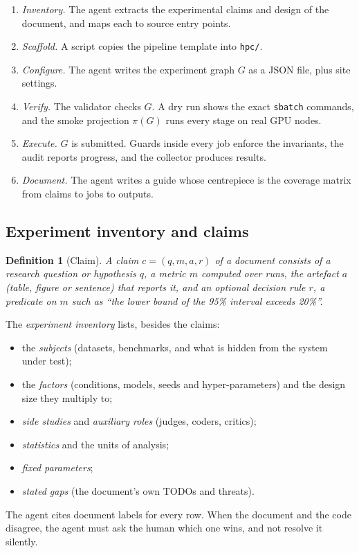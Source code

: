 \documentclass[pdflatex,sn-mathphys-num]{sn-jnl}
\theoremstyle{thmstyleone}%
\theoremstyle{thmstyletwo}%
\theoremstyle{thmstylethree}%
\newtheorem{definition}{Definition}%
\newcommand{\code}[1]{\texttt{#1}}
\begin{document}
\begin{enumerate}[leftmargin=1.4em, itemsep=1pt]
\item \emph{Inventory.} The agent extracts the experimental claims and design
of the document, and maps each to source entry points.
\item \emph{Scaffold.} A script copies the pipeline template into
\code{hpc/}.
\item \emph{Configure.} The agent writes the experiment graph $G$ as a JSON
file, plus site settings.
\item \emph{Verify.} The validator checks $G$. A dry run shows the exact
\code{sbatch} commands, and the smoke projection $\pi(G)$ runs every stage on
real GPU nodes.
\item \emph{Execute.} $G$ is submitted. Guards inside every job enforce the
invariants, the audit reports progress, and the collector produces results.
\item \emph{Document.} The agent writes a guide whose centrepiece is the
coverage matrix from claims to jobs to outputs.
\end{enumerate}

\subsection{Experiment inventory and claims}\label{sec:inventory}

\begin{definition}[Claim]\label{def:claim}
A \emph{claim} $c=(q,m,a,r)$ of a document consists of a research question or
hypothesis $q$, a metric $m$ computed over runs, the artefact $a$ (table,
figure or sentence) that reports it, and an optional decision rule $r$, a
predicate on $m$ such as ``the lower bound of the 95\% interval exceeds 20\%''.
\end{definition}

The \emph{experiment inventory} lists, besides the claims:
\begin{itemize}[leftmargin=1.4em, itemsep=1pt]
\item the \emph{subjects} (datasets, benchmarks, and what is hidden from the
system under test);
\item the \emph{factors} (conditions, models, seeds and hyper-parameters) and
the design size they multiply to;
\item \emph{side studies} and \emph{auxiliary roles} (judges, coders, critics);
\item \emph{statistics} and the units of analysis;
\item \emph{fixed parameters};
\item \emph{stated gaps} (the document's own TODOs and threats).
\end{itemize}
The agent cites document labels for every row. When the document and the code
disagree, the agent must ask the human which one wins, and not resolve it
silently.
\end{document}
